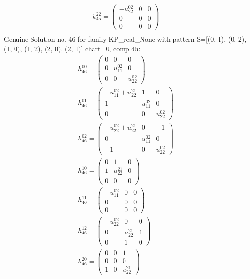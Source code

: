 \documentclass[a4paper, 11pt, twoside, onecolumn]{article}
\begin{document}
\begin{landscape}
\begin{gather*}
	 h_{45}^{22}=\begin{pmatrix}- u^{02}_{22} & 0 & 0\\0 & 0 & 0\\0 & 0 & 0\end{pmatrix}\\ 
\end{gather*} 
Genuine Solution no. 46 for family KP_real_None with pattern S=[(0, 1), (0, 2), (1, 0), (1, 2), (2, 0), (2, 1)] chart=0, comp 45: 
\begin{gather*} 
	 h_{46}^{00}=\begin{pmatrix}0 & 0 & 0\\0 & u^{02}_{11} & 0\\0 & 0 & u^{02}_{22}\end{pmatrix}\\ 
	 h_{46}^{01}=\begin{pmatrix}- u^{02}_{11} + u^{21}_{22} & 1 & 0\\1 & u^{02}_{11} & 0\\0 & 0 & u^{02}_{22}\end{pmatrix}\\ 
	 h_{46}^{02}=\begin{pmatrix}- u^{02}_{22} + u^{21}_{22} & 0 & -1\\0 & u^{02}_{11} & 0\\-1 & 0 & u^{02}_{22}\end{pmatrix}\\ 
	 h_{46}^{10}=\begin{pmatrix}0 & 1 & 0\\1 & u^{21}_{22} & 0\\0 & 0 & 0\end{pmatrix}\\ 
	 h_{46}^{11}=\begin{pmatrix}- u^{02}_{11} & 0 & 0\\0 & 0 & 0\\0 & 0 & 0\end{pmatrix}\\ 
	 h_{46}^{12}=\begin{pmatrix}- u^{02}_{22} & 0 & 0\\0 & u^{21}_{22} & 1\\0 & 1 & 0\end{pmatrix}\\ 
	 h_{46}^{20}=\begin{pmatrix}0 & 0 & 1\\0 & 0 & 0\\1 & 0 & u^{21}_{22}\end{pmatrix}\\ 

\end{gather*}
\end{landscape}
\end{document}
